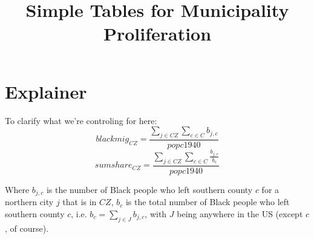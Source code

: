 \documentclass{article}
\title{Simple Tables for Municipality Proliferation}
\begin{document}
\maketitle
\tableofcontents
{\footnotesize 
\listoffigures
\listoftables}
\clearpage

\section*{Explainer}
To clarify what we're controling for here:
\[
	blackmig_{CZ} = \frac{\sum\limits_{j \in CZ} \sum\limits_{c \in C} b_{j,c}}{popc1940}
\]
\[
	sumshare_{CZ} = \frac{\sum\limits_{j \in CZ} \sum\limits_{c \in C} \frac{b_{j,c}}{b_c}}{popc1940}
\]

Where $b_{j,c}$ is the number of Black people who left southern county $c$ for a northern city $j$ that is in $CZ$, $b_c$ is the total number of Black people who left southern county $c$, i.e. $b_c = \sum\limits_{j \in J} b_{j,c}$, with $J$ being anywhere in the US (except $c$, of course).
\end{document}
